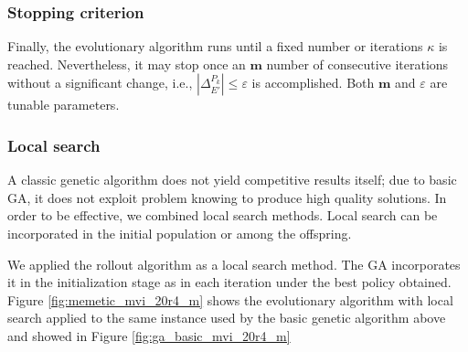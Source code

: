 \subsubsection*{Stopping criterion}

Finally, the evolutionary algorithm runs until a fixed number or iterations $\kappa$ is reached. Nevertheless, it may stop once an $\mathbf{m}$ number of consecutive iterations without a significant change, i.e., $|\Delta^{P_k}_{E'}|\leq \varepsilon$ is accomplished. Both $\mathbf{m}$ and $\varepsilon$ are tunable parameters.





\subsubsection*{Local search}


A classic genetic algorithm does not yield competitive results itself; due to basic GA, it does not exploit problem knowing to produce high quality solutions. In order to be effective, we combined local search methods. Local search can be incorporated in the initial population or among the offspring.

We applied the rollout algorithm as a local search method. The GA incorporates it in the initialization stage as in each iteration under the best policy obtained. Figure \ref{fig:memetic_mvi_20r4_m} shows the evolutionary algorithm with local search applied to the same instance used by the basic genetic algorithm above and showed in Figure \ref{fig:ga_basic_mvi_20r4_m}


